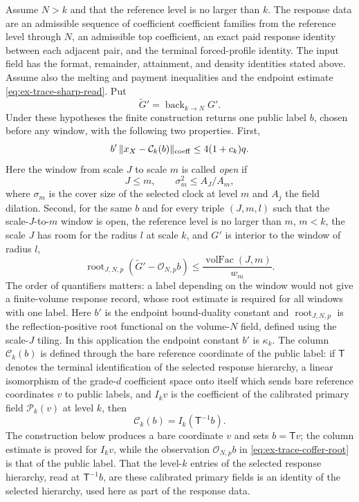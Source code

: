 Assume \(N>k\) and that the reference level is no larger than \(k\).
The response data are an admissible
sequence of coefficient coefficient families from the reference level through \(N\), an
admissible top coefficient, an exact paid response identity between each
adjacent pair, and the terminal forced-profile identity. The input field
has the format, remainder, attainment, and density identities stated above.
Assume also the melting and payment inequalities and the endpoint estimate
\eqref{eq:ex-trace-sharp-read}. Put
\[
 \widetilde G'=\operatorname{back}_{k\to N}G'.
\]
Under these hypotheses the finite construction returns one public label
\(b\), chosen before any window, with the following two properties. First,
\begin{equation}
 b'\,\|x_X-\mathcal C_k(b)\|_{\rm coeff}
   \leq 4(1+c_k)q. \label{eq:ex-trace-coffer-column}
\end{equation}
Here the window from scale \(J\) to scale \(m\) is called \emph{open} if
\[
 J\leq m,\qquad \sigma_m^2\leq A_J/A_m,
\]
where \(\sigma_m\) is the cover size of the selected clock at level \(m\)
and \(A_j\) the field dilation. Second, for the same \(b\) and for every
triple \((J,m,l)\) such that the
scale-\(J\)-to-\(m\) window is open, the reference level is no larger than
\(m\), \(m<k\), the scale \(J\) has room for the radius \(l\) at scale
\(k\), and \(G'\) is interior to the window of radius \(l\),
\begin{equation}
 \operatorname{root}_{J,N,p}(\widetilde G'-\mathcal O_{N,p}b)
   \leq \frac{\operatorname{volFac}(J,m)}{w_m}.
 \label{eq:ex-trace-coffer-root}
\end{equation}
The order of quantifiers matters: a label depending on the window would
not give a finite-volume response record, whose root estimate is required for all windows with one
label. Here \(b'\) is the endpoint bound-duality constant and
\(\operatorname{root}_{J,N,p}\) is the reflection-positive root functional
on the volume-\(N\) field, defined using the scale-\(J\) tiling. In this
application the endpoint constant $b'$ is $\kappa_k$. The column
\(\mathcal C_k(b)\) is defined through the bare reference coordinate of
the public label: if \(\mathsf T\) denotes the terminal identification of
the selected response hierarchy, a linear isomorphism of the grade-\(d\)
coefficient space onto itself which sends bare reference
coordinates \(v\) to public labels, and \(I_k v\) is the coefficient of
the calibrated primary field \(\mathcal P_k(v)\) at level \(k\), then
\[
 \mathcal C_k(b)=I_k(\mathsf T^{-1}b).
\]
The construction below produces a bare coordinate \(v\) and sets
\(b=\mathsf T v\); the column estimate is proved for \(I_kv\), while the
observation \(\mathcal O_{N,p}b\) in \eqref{eq:ex-trace-coffer-root} is
that of the public label. That the level-\(k\) entries of the selected
response hierarchy, read at \(\mathsf T^{-1}b\), are these calibrated
primary fields is an identity of the selected hierarchy, used here as part
of the response data.

